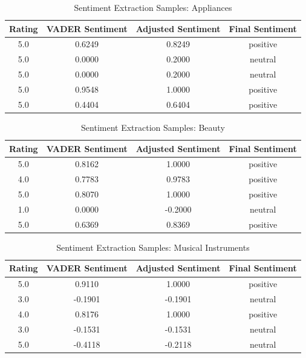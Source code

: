 \documentclass[a4paper, 12pt]{article}
\begin{document}
\begin{table}[H]
    \centering
    \caption{Sentiment Extraction Samples: Appliances}
    \begin{tabular}{cccc}
        \hline
        \textbf{Rating} & \textbf{VADER Sentiment} & \textbf{Adjusted Sentiment} & \textbf{Final Sentiment} \\
        \hline
        5.0 &  0.6249 &  0.8249 & positive \\
        5.0 &  0.0000 &  0.2000 & neutral \\
        5.0 &  0.0000 &  0.2000 & neutral \\
        5.0 &  0.9548 &  1.0000 & positive \\
        5.0 &  0.4404 &  0.6404 & positive \\
        \hline
    \end{tabular}
\end{table}

\begin{table}[H]
    \centering
    \caption{Sentiment Extraction Samples: Beauty}
    \begin{tabular}{cccc}
        \hline
        \textbf{Rating} & \textbf{VADER Sentiment} & \textbf{Adjusted Sentiment} & \textbf{Final Sentiment} \\
        \hline
        5.0 &  0.8162 &  1.0000 & positive \\
        4.0 &  0.7783 &  0.9783 & positive \\
        5.0 &  0.8070 &  1.0000 & positive \\
        1.0 &  0.0000 & -0.2000 & neutral \\
        5.0 &  0.6369 &  0.8369 & positive \\
        \hline
    \end{tabular}
\end{table}

\begin{table}[H]
    \centering
    \caption{Sentiment Extraction Samples: Musical Instruments}
    \begin{tabular}{cccc}
        \hline
        \textbf{Rating} & \textbf{VADER Sentiment} & \textbf{Adjusted Sentiment} & \textbf{Final Sentiment} \\
        \hline
        5.0 &  0.9110 &  1.0000 & positive \\
        3.0 & -0.1901 & -0.1901 & neutral \\
        4.0 &  0.8176 &  1.0000 & positive \\
        3.0 & -0.1531 & -0.1531 & neutral \\
        5.0 & -0.4118 & -0.2118 & neutral \\
        \hline
    \end{tabular}
\end{table}
\end{document}
